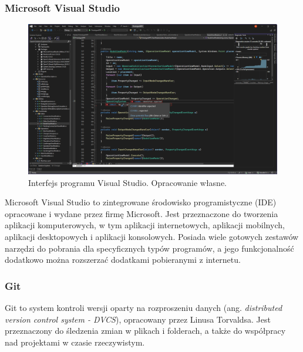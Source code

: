\subsubsection{Microsoft Visual Studio}
\begin{figure}[H]
    \centering
    \includegraphics[width=1\linewidth]{./images/Picture10.png}
    \caption{Interfejs programu Visual Studio. Opracowanie własne.}
    \label{fig:visual}
\end{figure}

Microsoft Visual Studio \cite{visualstudio} to zintegrowane środowisko programistyczne (IDE) opracowane i wydane przez firmę Microsoft. Jest przeznaczone do tworzenia aplikacji komputerowych, w tym aplikacji internetowych, aplikacji mobilnych, aplikacji desktopowych i aplikacji konsolowych. Posiada wiele gotowych zestawów narzędzi do pobrania dla specyficznych typów programów, a jego funkcjonalność dodatkowo można rozszerzać dodatkami pobieranymi z internetu.

\subsubsection{Git}

Git \cite{git} to system kontroli wersji oparty na rozproszeniu danych (ang. \textit{distributed version control system - DVCS}), opracowany przez Linusa Torvaldsa. Jest przeznaczony do śledzenia zmian w plikach i folderach, a także do współpracy nad projektami w czasie rzeczywistym. 